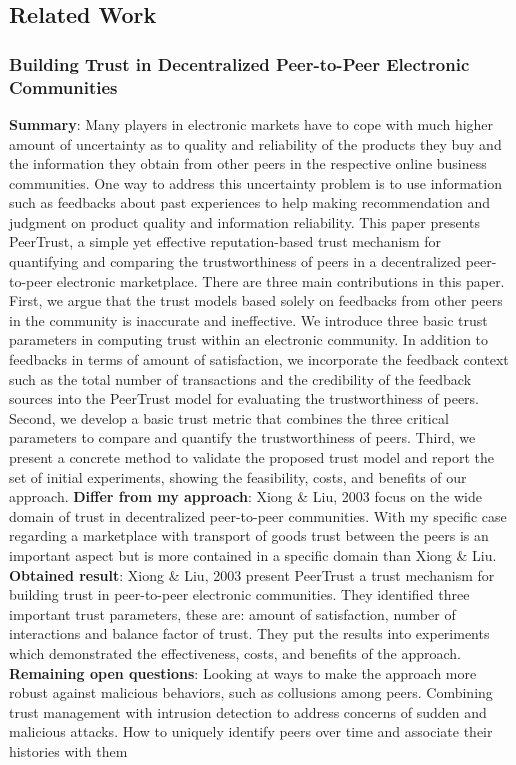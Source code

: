 \subsection{Related Work}

\subsubsection{Building Trust in Decentralized Peer-to-Peer Electronic Communities \cite{buildTrust}}
\textbf{Summary}: Many players in electronic markets have to cope with much higher amount of uncertainty as to quality and reliability of the products they buy and the information they obtain from other peers in the respective online business communities. One way to address this uncertainty problem is to use information such as feedbacks about past experiences to help making recommendation and judgment on product quality and information reliability. This paper presents PeerTrust, a simple yet effective reputation-based trust mechanism for quantifying and comparing the trustworthiness of peers in a decentralized peer-to-peer electronic marketplace. There are three main contributions in this paper. First, we argue that the trust models based solely on feedbacks from other peers in the community is inaccurate and ineffective. We introduce three basic trust parameters in computing trust within an electronic community. In addition to feedbacks in terms of amount of satisfaction, we incorporate the feedback context such as the total number of transactions and the credibility of the feedback sources into the PeerTrust model for evaluating the trustworthiness of peers. Second, we develop a basic trust metric that combines the three critical parameters to compare and quantify the trustworthiness of peers. Third, we present a concrete method to validate the proposed trust model and report the set of initial experiments, showing the feasibility, costs, and benefits of our approach.\newline
\textbf{Differ from my approach}: Xiong \& Liu, 2003 focus on the wide domain of trust in decentralized peer-to-peer communities. With my specific case regarding a marketplace with transport of goods trust between the peers is an important aspect but is more contained in a specific domain than Xiong \& Liu.\newline
\textbf{Obtained result}: Xiong \& Liu, 2003 present PeerTrust a trust mechanism for building trust in peer-to-peer electronic communities. They identified three important trust parameters, these are: amount of satisfaction, number of interactions and balance factor of trust. They put the results into experiments which demonstrated the effectiveness, costs, and benefits of the approach.\newline
\textbf{Remaining open questions}: Looking at ways to make the approach more robust against malicious behaviors, such as collusions among peers. Combining trust management with intrusion detection to address concerns of sudden and malicious attacks. How to uniquely identify peers over time and associate their histories with them\newline

